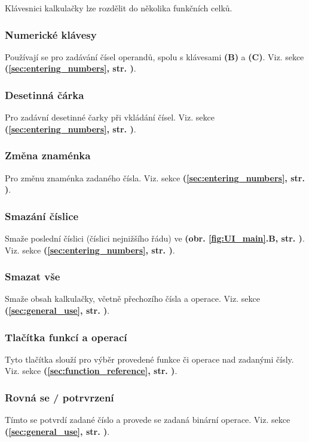 \documentclass[a5paper,8pt,twoside]{extarticle}
\newcommand*\nref[1]{\textbf{(\ref{#1}, str. \pageref{#1})}}
\newcommand*\fref[2]{\textbf{(obr. \ref{#1}#2, str. \pageref{#1})}}
\begin{document}
    Klávesnici kalkulačky lze rozdělit do několika funkčních celků.

    \subsubsection{Numerické klávesy}
    Používají se pro zadávání čísel operandů, spolu s klávesami  \textbf{(B)} a  \textbf{(C)}. Viz. sekce  \nref{sec:entering_numbers}.

    \subsubsection{Desetinná čárka}
    Pro zadávní desetinné čarky při vkládání čísel. Viz. sekce  \nref{sec:entering_numbers}.

    \subsubsection{Změna znaménka}
    Pro změnu znaménka zadaného čísla. Viz. sekce  \nref{sec:entering_numbers}.

    \subsubsection{Smazání číslice}
    Smaže poslední číslici (číslici nejnižšího řádu) ve  \fref{fig:UI_main}{.B}. Viz. sekce  \nref{sec:entering_numbers}.

    \subsubsection{Smazat vše}
    Smaže obsah kalkulačky, včetně přechozího čísla a operace. Viz. sekce  \nref{sec:general_use}.

    \subsubsection{Tlačítka funkcí a operací}
    Tyto tlačítka slouží pro výběr provedené funkce či operace nad zadanými čísly. Viz. sekce  \nref{sec:function_reference}.

    \subsubsection{Rovná se / potrvrzení}
    Tímto se potvrdí zadané číslo a provede se zadaná binární operace. Viz. sekce  \nref{sec:general_use}.
\end{document}
